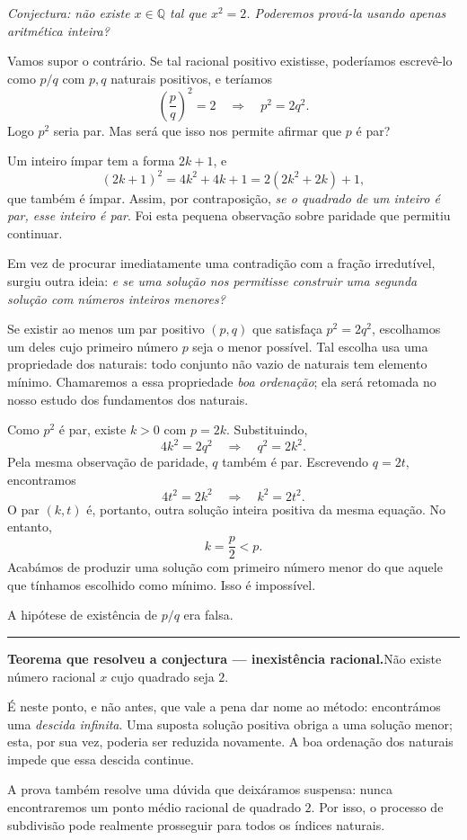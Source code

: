 \documentclass[11pt,a4paper]{article}
\newcommand{\Q}{\mathbb{Q}}
\newcommand{\questao}[1]{\par\medskip\noindent\textit{#1}\par\smallskip}
\newcommand{\assentado}[2]{%
\par\medskip\noindent\begingroup\color{azul}\rule{\linewidth}{0.45pt}\par\smallskip
\noindent\textbf{#1.}\enspace #2\par\endgroup\medskip}
\begin{document}
\questao{Conjectura: não existe $x\in\Q$ tal que $x^2=2$. Poderemos prová-la usando apenas aritmética inteira?}

Vamos supor o contrário. Se tal racional positivo existisse, poderíamos escrevê-lo como $p/q$ com $p,q$ naturais positivos, e teríamos
\[
\left(\frac pq\right)^2=2
\quad\Longrightarrow\quad
p^2=2q^2.
\]
Logo $p^2$ seria par. Mas será que isso nos permite afirmar que $p$ é par?

Um inteiro ímpar tem a forma $2k+1$, e
\[
(2k+1)^2=4k^2+4k+1=2(2k^2+2k)+1,
\]
que também é ímpar. Assim, por contraposição, \emph{se o quadrado de um inteiro é par, esse inteiro é par}. Foi esta pequena observação sobre paridade que permitiu continuar.

Em vez de procurar imediatamente uma contradição com a fração irredutível, surgiu outra ideia: \emph{e se uma solução nos permitisse construir uma segunda solução com números inteiros menores?}

Se existir ao menos um par positivo $(p,q)$ que satisfaça $p^2=2q^2$, escolhamos um deles cujo primeiro número $p$ seja o menor possível. Tal escolha usa uma propriedade dos naturais: todo conjunto não vazio de naturais tem elemento mínimo. Chamaremos a essa propriedade \emph{boa ordenação}; ela será retomada no nosso estudo dos fundamentos dos naturais.

Como $p^2$ é par, existe $k>0$ com $p=2k$. Substituindo,
\[
4k^2=2q^2
\quad\Longrightarrow\quad
q^2=2k^2.
\]
Pela mesma observação de paridade, $q$ também é par. Escrevendo $q=2t$, encontramos
\[
4t^2=2k^2
\quad\Longrightarrow\quad
k^2=2t^2.
\]
O par $(k,t)$ é, portanto, outra solução inteira positiva da mesma equação. No entanto,
\[
k=\frac p2<p.
\]
Acabámos de produzir uma solução com primeiro número menor do que aquele que tínhamos escolhido como mínimo. Isso é impossível.

A hipótese de existência de $p/q$ era falsa.

\assentado{Teorema que resolveu a conjectura --- inexistência racional}{Não existe número racional $x$ cujo quadrado seja $2$.}

É neste ponto, e não antes, que vale a pena dar nome ao método: encontrámos uma \emph{descida infinita}. Uma suposta solução positiva obriga a uma solução menor; esta, por sua vez, poderia ser reduzida novamente. A boa ordenação dos naturais impede que essa descida continue.

A prova também resolve uma dúvida que deixáramos suspensa: nunca encontraremos um ponto médio racional de quadrado $2$. Por isso, o processo de subdivisão pode realmente prosseguir para todos os índices naturais.
\end{document}
